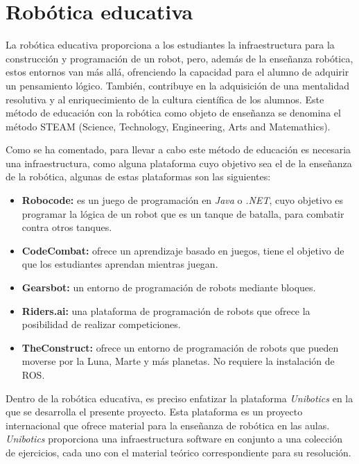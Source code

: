 \documentclass[a4paper, 12pt]{book}
\begin{document}
\section{Robótica educativa}
\label{sec:robotica educativa}

La robótica educativa proporciona a los estudiantes la infraestructura para la construcción y programación de un robot, pero, además de la enseñanza robótica,
estos entornos van más allá, ofrenciendo la capacidad para el alumno de adquirir un pensamiento lógico. También, contribuye en la adquisición de una mentalidad resolutiva y al enriquecimiento de la cultura científica de los alumnos. Este método de educación con la robótica como objeto de enseñanza se denomina el método STEAM (Science, Technology, Engineering, Arts and Matemathics).

Como se ha comentado, para llevar a cabo este método de educación es necesaria una infraestructura, como alguna plataforma cuyo objetivo sea el de la enseñanza de la robótica, algunas de estas plataformas son las siguientes:

\begin{itemize}
\item \textbf{Robocode:} es un juego de programación en \emph{Java} o \emph{.NET}, cuyo objetivo es programar la lógica de un robot que es un tanque de batalla, para combatir contra otros tanques. 
\item \textbf{CodeCombat:} ofrece un aprendizaje basado en juegos, tiene el objetivo de que los estudiantes aprendan mientras juegan.
\item \textbf{Gearsbot:} un entorno de programación de robots mediante bloques.
\item \textbf{Riders.ai:} una plataforma de programación de robots que ofrece la posibilidad de realizar competiciones.
\item \textbf{TheConstruct:} ofrece un entorno de programación de robots que pueden moverse por la Luna, Marte y más planetas. No requiere la instalación de ROS.
\end{itemize}

Dentro de la robótica educativa, es preciso enfatizar la plataforma \textit{Unibotics} en la que se desarrolla el presente proyecto. Esta plataforma es un proyecto internacional que ofrece material para la enseñanza de robótica en las aulas. \textit{Unibotics} proporciona una infraestructura software en conjunto a una colección de ejercicios, cada uno con el material teórico correspondiente para su resolución.
\end{document}
